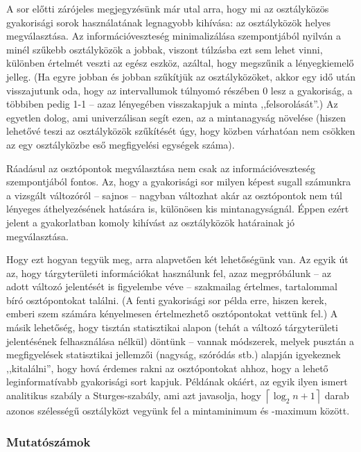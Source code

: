 \documentclass[]{book}
\begin{document}
A sor előtti zárójeles megjegyzésünk már utal arra, hogy mi az
osztályközös gyakorisági sorok használatának legnagyobb kihívása: az
osztályközök helyes megválasztása. Az információveszteség minimalizálása
szempontjából nyilván a minél szűkebb osztályközök a jobbak, viszont
túlzásba ezt sem lehet vinni, különben értelmét veszti az egész eszköz,
azáltal, hogy megszűnik a lényegkiemelő jelleg. (Ha egyre jobban és
jobban szűkítjük az osztályközöket, akkor egy idő után visszajutunk oda,
hogy az intervallumok túlnyomó részében 0 lesz a gyakoriság, a többiben
pedig 1-1 -- azaz lényegében visszakapjuk a minta ,,felsorolását''.) Az
egyetlen dolog, ami univerzálisan segít ezen, az a mintanagyság növelése
(hiszen lehetővé teszi az osztályközök szűkítését úgy, hogy közben
várhatóan nem csökken az egy osztályközbe eső megfigyelési egységek
száma).

Ráadásul az osztópontok megválasztása nem csak az információveszteség
szempontjából fontos. Az, hogy a gyakorisági sor milyen képest sugall
számunkra a vizsgált változóról -- sajnos -- nagyban változhat akár az
osztópontok nem túl lényeges áthelyezésének hatására is, különösen kis
mintanagyságnál. Éppen ezért jelent a gyakorlatban komoly kihívást az
osztályközök határainak jó megválasztása.

Hogy ezt hogyan tegyük meg, arra alapvetően két lehetőségünk van. Az
egyik út az, hogy tárgyterületi információkat használunk fel, azaz
megpróbálunk -- az adott változó jelentését is figyelembe véve --
szakmailag értelmes, tartalommal bíró osztópontokat találni. (A fenti
gyakorisági sor példa erre, hiszen kerek, emberi szem számára
kényelmesen értelmezhető osztópontokat vettünk fel.) A másik lehetőség,
hogy tisztán statisztikai alapon (tehát a változó tárgyterületi
jelentésének felhasználása nélkül) döntünk -- vannak módszerek, melyek
pusztán a megfigyelések statisztikai jellemzői (nagyság, szóródás stb.)
alapján igyekeznek ,,kitalálni'', hogy hová érdemes rakni az
osztópontokat ahhoz, hogy a lehető leginformatívabb gyakorisági sort
kapjuk. Példának okáért, az egyik ilyen ismert analitikus szabály a
Sturges-szabály, ami azt javasolja, hogy
\(\left\lceil \log_2 n+1\right\rceil\) darab azonos szélességű
osztályközt vegyünk fel a mintaminimum és -maximum között.

\subsubsection{Mutatószámok}\label{deskriptivmennyegyvaltanalitikusmutatoszamok}
\end{document}
